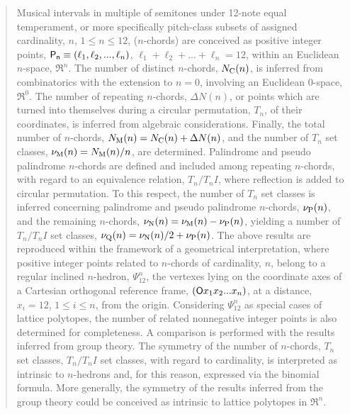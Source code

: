 \documentclass[12pt,a4paper]{article}
\begin{document}
\begin{quotation}
\begin{small}
\noindent\noindent
Musical intervals in multiple of semitones under 12-note equal temperament, or
more specifically
pitch-class subsets of assigned cardinality, $n$, $1\le n\le12$, ($n$-chords)
are conceived as positive integer points,
${\sf P_n}\equiv(\ell_1,\ell_2,...,\ell_n)$,
$\ell_1+\ell_2+...+\ell_n=12$,
within an Euclidean $n$-space,
$\Re^n$.   The number of distinct $n$-chords, $N_{\rm C}(n)$, is inferred
from combinatorics with the extension to $n=0$, involving an Euclidean
0-space, $\Re^0$.
The number of repeating $n$-chords, $\Delta N(n)$, or points which are
turned into themselves
during a circular permutation, $T_n$, of their coordinates, is inferred
from algebraic considerations.  
Finally, the total number of $n$-chords,
$N_{\rm M}(n)=N_{\rm C}(n)+\Delta N(n)$, and the number of $T_n$ set classes,
$\nu_{\rm M}(n)=N_{\rm M}(n)/n$, are determined.   Palindrome and pseudo
palindrome $n$-chords are defined and included among repeating $n$-chords,
with regard to an equivalence relation, $T_n/T_nI$, where reflection is added to
circular permutation.   To this respect, the number of $T_n$ set classes
is inferred concerning palindrome and pseudo palindrome $n$-chords,
$\nu_{\rm P}(n)$, and the remaining $n$-chords,
$\nu_{\rm N}(n)=\nu_{\rm M}(n)-\nu_{\rm P}(n)$, yielding a number of
$T_n/T_nI$ set classes,
$\nu_{\rm Q}(n)=\nu_{\rm N}(n)/2+\nu_{\rm P}(n)$.
The above results are reproduced within the framework of a geometrical
interpretation, where positive integer points related to $n$-chords of
cardinality, $n$, belong to a regular inclined $n$-hedron, $\Psi_{12}^n$, the
vertexes lying on the coordinate axes of a Cartesian orthogonal reference
frame, $({\sf O}x_1x_2...x_n)$, at a distance, $x_i=12$, $1\le i\le n$,
from the origin.   Considering $\Psi_{12}^n$ as special cases of lattice
polytopes,
the number of related nonnegative integer points is also determined for
completeness.   A comparison is performed with the results inferred from group
theory.    The symmetry of the number of $n$-chords, $T_n$ set classes,
$T_n/T_nI$ set classes, with regard to cardinality, is interpreted as
intrinsic to $n$-hedrons and, for this reason, expressed via the binomial
formula.   More generally, the symmetry of the results inferred from the group
theory could be conceived as intrinsic to lattice polytopes in $\Re^n$.


\end{small}
\end{quotation}
\end{document}
